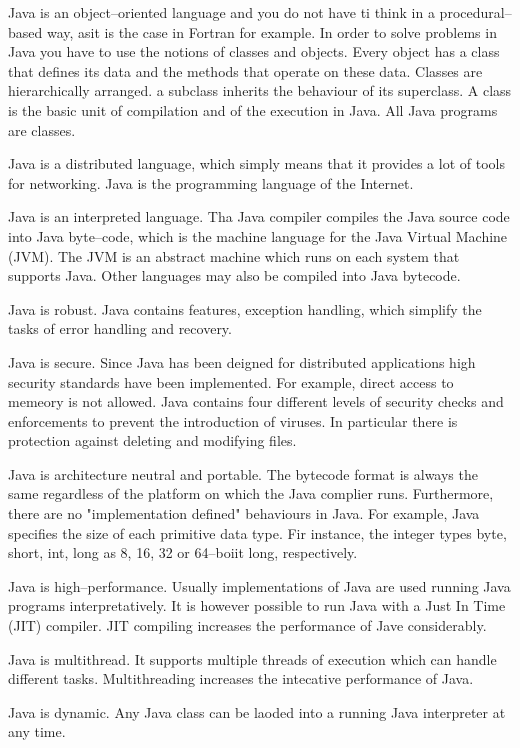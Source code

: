 Java is an object--oriented language and you do not have ti think in a 
procedural--based way, asit is the case in Fortran for example. In order to 
solve problems in Java you have to use the notions of classes and objects. 
Every object has a class that defines its data and the methods that operate 
on these data. Classes are hierarchically arranged. a subclass inherits the 
behaviour of its superclass. A class is the basic unit of compilation
and of the execution in Java. All Java programs are classes.

Java is a distributed language, which simply means that it provides a lot of 
tools for networking. Java is the programming language of the Internet.

Java is an interpreted language. Tha Java compiler compiles the Java
source code into Java byte--code, which is the machine language for the Java
Virtual Machine (JVM). The JVM is an abstract machine which runs on each system
that supports Java. Other languages may also be compiled into Java bytecode.

Java is robust. Java contains features, exception handling, which simplify the
tasks of error handling and recovery.

Java is secure. Since Java has been deigned for distributed applications 
high security standards have been implemented. For example, direct access to
memeory is not allowed. Java contains four different levels of security 
checks and enforcements to prevent the introduction of viruses. 
In particular there is protection against deleting and modifying files.

Java is architecture neutral and portable. The bytecode format is always the 
same regardless of the platform on which the Java complier runs. Furthermore,
there are no "implementation defined" behaviours in Java. For example, Java
specifies the size of each primitive data type. Fir instance, the integer 
types byte, short, int, long as 8, 16, 32 or 64--boiit long, respectively.

Java is high--performance. Usually implementations of Java are used running 
Java programs interpretatively. It is however possible to run Java with a 
Just In Time (JIT) compiler. JIT compiling increases the performance of Jave 
considerably.

Java is multithread. It supports multiple threads of execution which can 
handle different tasks. Multithreading increases the intecative performance 
of Java.

Java is dynamic. Any Java class can be laoded into a running Java interpreter 
at any time.



